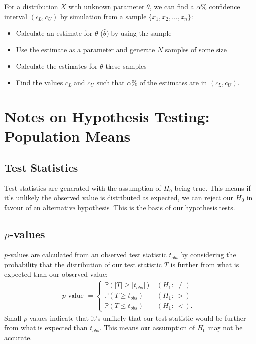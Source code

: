 \documentclass[a4paper, 12pt, twoside]{article}
\begin{document}
For a distribution $X$ with unknown parameter $\theta$, we can
find a $\alpha\%$ confidence interval $(c_L, c_U)$ by simulation from
a sample $\{x_1, x_2, \ldots, x_n\}$:

\begin{itemize}
    \item Calculate an estimate for $\theta$ ($\hat\theta$) by using the
          sample
    \item Use the estimate as a parameter and generate $N$ samples of
          some size
    \item Calculate the estimates for $\theta$ these samples
    \item Find the values $c_L$ and $c_U$ such that $\alpha\%$ of
          the estimates are in $(c_L, c_U)$.
\end{itemize}

\section{Notes on Hypothesis Testing: Population Means}

\subsection{Test Statistics}

Test statistics are generated with the assumption of $H_0$ being true.
This means if it's unlikely the observed value is distributed as
expected, we can reject our $H_0$ in favour of an alternative
hypothesis. This is the basis of our hypothesis tests.

\subsection{$p$-values}

$p$-values are calculated from an observed test statistic $t_{obs}$
by considering the probability that the distribution of our
test statistic $T$ is further from what is expected than our observed
value:
\begin{align*}
    p\text{-value } = \begin{cases}
        \mathbb{P}(|T| \geq |t_{obs}|) & (H_1 : \, \neq) \\
        \mathbb{P}(T \geq t_{obs})     & (H_1 : \, >)    \\
        \mathbb{P}(T \leq t_{obs})     & (H_1 : \, <).
    \end{cases}
\end{align*}
Small $p$-values indicate that it's unlikely that our
test statistic would be further from what is expected than
$t_{obs}$. This means our assumption of $H_0$ may not be
accurate.
\end{document}
